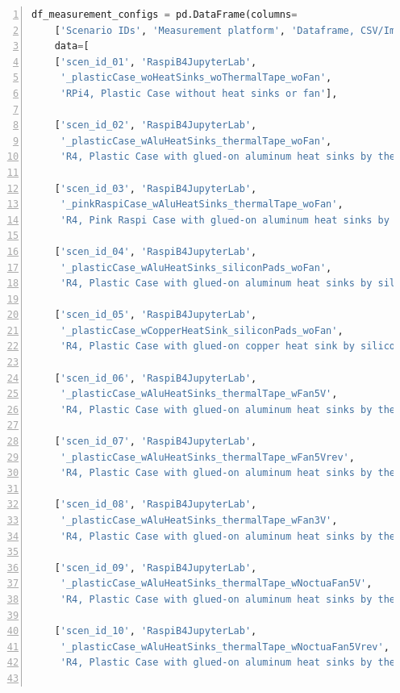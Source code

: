 \documentclass[10pt,parskip=half,
toc=sectionentrywithdots,
bibliography=totocnumbered,
captions=tableheading,numbers=noendperiod]{scrartcl}
\begin{document}
\begin{codecell}[H]
\caption{Dataframe of all scenarios}
\label{code:df_scenarios_1}
\begin{lstlisting}[language=Python,numbers=left,xleftmargin=20pt,xrightmargin=5pt,belowskip=5pt,aboveskip=5pt]
df_measurement_configs = pd.DataFrame(columns=
    ['Scenario IDs', 'Measurement platform', 'Dataframe, CSV/Image suffixes', 'Diagramm description'],
    data=[
    ['scen_id_01', 'RaspiB4JupyterLab',
     '_plasticCase_woHeatSinks_woThermalTape_woFan',
     'RPi4, Plastic Case without heat sinks or fan'],

    ['scen_id_02', 'RaspiB4JupyterLab',
     '_plasticCase_wAluHeatSinks_thermalTape_woFan',
     'R4, Plastic Case with glued-on aluminum heat sinks by thermal tape, without fan'],

    ['scen_id_03', 'RaspiB4JupyterLab',
     '_pinkRaspiCase_wAluHeatSinks_thermalTape_woFan',
     'R4, Pink Raspi Case with glued-on aluminum heat sinks by thermal tape, without fan'],

    ['scen_id_04', 'RaspiB4JupyterLab',
     '_plasticCase_wAluHeatSinks_siliconPads_woFan',
     'R4, Plastic Case with glued-on aluminum heat sinks by silicone pads, without fan'],

    ['scen_id_05', 'RaspiB4JupyterLab',
     '_plasticCase_wCopperHeatSink_siliconPads_woFan',
     'R4, Plastic Case with glued-on copper heat sink by silicone pad, without fan'],

    ['scen_id_06', 'RaspiB4JupyterLab',
     '_plasticCase_wAluHeatSinks_thermalTape_wFan5V',
     'R4, Plastic Case with glued-on aluminum heat sinks by thermal tape, with fan (5 V)'],

    ['scen_id_07', 'RaspiB4JupyterLab',
     '_plasticCase_wAluHeatSinks_thermalTape_wFan5Vrev',
     'R4, Plastic Case with glued-on aluminum heat sinks by thermal tape, with fan reverted (5 V)'],

    ['scen_id_08', 'RaspiB4JupyterLab',
     '_plasticCase_wAluHeatSinks_thermalTape_wFan3V',
     'R4, Plastic Case with glued-on aluminum heat sinks by thermal tape, with fan (3.3 V)'],

    ['scen_id_09', 'RaspiB4JupyterLab',
     '_plasticCase_wAluHeatSinks_thermalTape_wNoctuaFan5V',
     'R4, Plastic Case with glued-on aluminum heat sinks by thermal tape, with Noctua fan (5 V)'],

    ['scen_id_10', 'RaspiB4JupyterLab',
     '_plasticCase_wAluHeatSinks_thermalTape_wNoctuaFan5Vrev',
     'R4, Plastic Case with glued-on aluminum heat sinks by thermal tape, with Noctua fan reverted (5 V)'],


\end{lstlisting}
\end{codecell}
\end{document}
